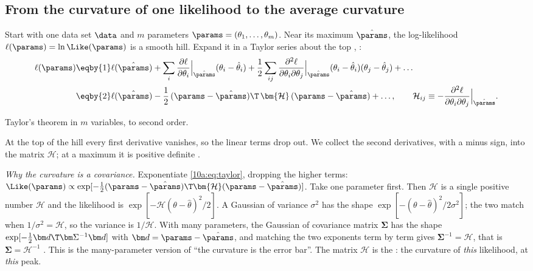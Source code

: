 \subsection{From the curvature of one likelihood to the average curvature}
\label{10a:sec:fisher-def}

Start with one data set $\data$ and $m$ parameters $\params=(\theta_1,\dots,\theta_m)$. Near its maximum
$\hat\params$, the log-likelihood $\ell(\params)=\ln\Like(\params)$ is a smooth hill. Expand it in a Taylor
series about the top , :
\begin{align}
  \ell(\params)
  &\eqby{1}\ell(\hat\params)+\sum_i\frac{\partial\ell}{\partial\theta_i}\Big|_{\hat\params}(\theta_i-\hat\theta_i)
   +\frac12\sum_{ij}\frac{\partial^2\ell}{\partial\theta_i\partial\theta_j}\Big|_{\hat\params}(\theta_i-\hat\theta_i)(\theta_j-\hat\theta_j)+\dots
  \nonumber\\
  &\eqby{2}\ell(\hat\params)-\frac12\,(\params-\hat\params)\T\,\bm{\mathcal H}\,(\params-\hat\params)+\dots,
  \qquad \mathcal H_{ij}\equiv-\frac{\partial^2\ell}{\partial\theta_i\partial\theta_j}\Big|_{\hat\params}.
  \label{10a:eq:taylor}
\end{align}
\begin{explain}
  \item Taylor's theorem in $m$ variables, to second order.
  \item At the top of the hill every first derivative vanishes, so the linear terms drop out. We collect
        the second derivatives, with a minus sign, into the matrix $\bm{\mathcal H}$; at a maximum it is
        positive definite .
\end{explain}
\emph{Why the curvature is a covariance.} Exponentiate \eqref{10a:eq:taylor}, dropping the higher terms:
$\Like(\params)\propto\exp[-\frac12(\params-\hat\params)\T\bm{\mathcal H}(\params-\hat\params)]$. Take one
parameter first. Then $\bm{\mathcal H}$ is a single positive number $\mathcal H$ and the likelihood is
$\exp[-\mathcal H(\theta-\hat\theta)^2/2]$. A Gaussian of variance $\sigma^2$ has the shape
$\exp[-(\theta-\hat\theta)^2/2\sigma^2]$; the two match when $1/\sigma^2=\mathcal H$, so the variance is
$1/\mathcal H$. With many parameters, the Gaussian of covariance matrix $\bm\Sigma$ has the shape
$\exp[-\frac12\bm d\T\bm\Sigma^{-1}\bm d]$ with $\bm d=\params-\hat\params$, and matching the two exponents term by term
gives $\bm\Sigma^{-1}=\bm{\mathcal H}$, that is $\bm\Sigma=\bm{\mathcal H}^{-1}$ . This is
the many-parameter version of ``the curvature is the error bar''. The matrix $\bm{\mathcal H}$ is the
: the curvature of \emph{this} likelihood, at \emph{this} peak.


